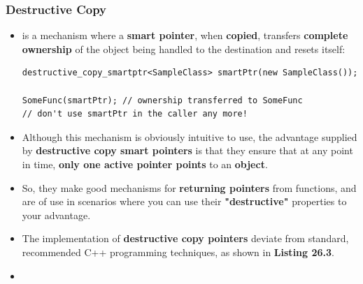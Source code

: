 \documentclass[10pt]{article}
\newcommand{\pbreak}{\vspace{30pt}}
\newcommand{\vocab}[1]{\fbox{\textbf{\textit{#1}}}}
\begin{document}
\newpage
\subsubsection{Destructive Copy}
\begin{itemize}
\item \vocab{Destructive copy} is a mechanism where a \textbf{smart pointer}, when \textbf{copied}, transfers \textbf{complete ownership} of the object being handled to the destination and resets itself:

	\begin{verbatim}
destructive_copy_smartptr<SampleClass> smartPtr(new SampleClass());

SomeFunc(smartPtr);	// ownership transferred to SomeFunc
// don't use smartPtr in the caller any more!
	\end{verbatim}

\item Although this mechanism is obviously intuitive to use, the advantage supplied by \textbf{destructive copy smart pointers} is that they ensure that at any point in time, \textbf{only one active pointer points} to an \textbf{object}.

\item So, they make good mechanisms for \textbf{returning pointers} from functions, and are of use in scenarios where you can use their \textbf{"destructive"} properties to your advantage.

\item The implementation of \textbf{destructive copy pointers} deviate from standard, recommended C++ programming techniques, as shown in \textbf{Listing 26.3}.

\item {}
\end{itemize}

\pbreak
\end{document}
